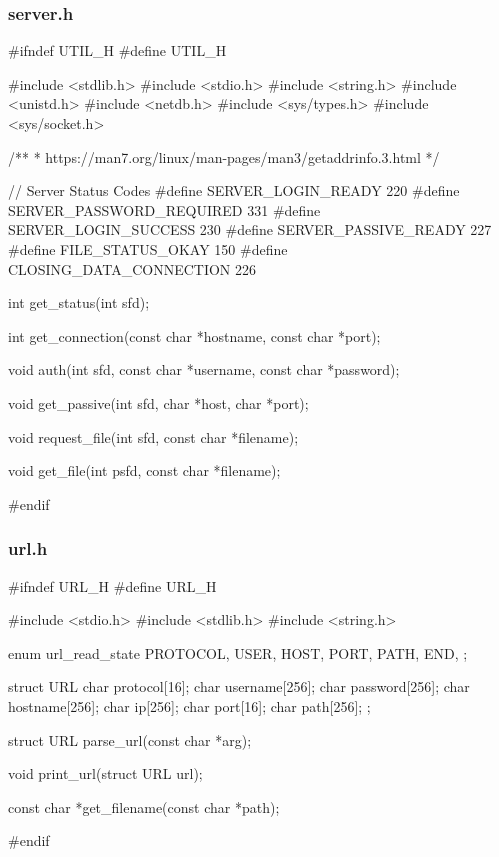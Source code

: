 \documentclass[11pt,a4paper,twocolumn]{article}
\begin{document}
\subsubsection{server.h}
\begin{c-darktheme}
    #ifndef UTIL_H
    #define UTIL_H
    
    #include <stdlib.h>
    #include <stdio.h>
    #include <string.h>
    #include <unistd.h>
    #include <netdb.h>
    #include <sys/types.h>
    #include <sys/socket.h>
    
    /**
     * https://man7.org/linux/man-pages/man3/getaddrinfo.3.html
     */
    
    // Server Status Codes
    #define SERVER_LOGIN_READY 220
    #define SERVER_PASSWORD_REQUIRED 331
    #define SERVER_LOGIN_SUCCESS 230
    #define SERVER_PASSIVE_READY 227
    #define FILE_STATUS_OKAY 150
    #define CLOSING_DATA_CONNECTION 226
    
    int get_status(int sfd);
    
    int get_connection(const char *hostname, const char *port);
    
    void auth(int sfd, const char *username, const char *password);
    
    void get_passive(int sfd, char *host, char *port);
    
    void request_file(int sfd, const char *filename);
    
    void get_file(int psfd, const char *filename);
    
    #endif
\end{c-darktheme}

\subsubsection{url.h}
\begin{c-darktheme}
    #ifndef URL_H
#define URL_H

#include <stdio.h>
#include <stdlib.h>
#include <string.h>

enum url_read_state
{
    PROTOCOL,
    USER,
    HOST,
    PORT,
    PATH,
    END,
};

struct URL
{
    char protocol[16];
    char username[256];
    char password[256];
    char hostname[256];
    char ip[256];
    char port[16];
    char path[256];
};

struct URL parse_url(const char *arg);

void print_url(struct URL url);

const char *get_filename(const char *path);

#endif
\end{c-darktheme}
\end{document}
